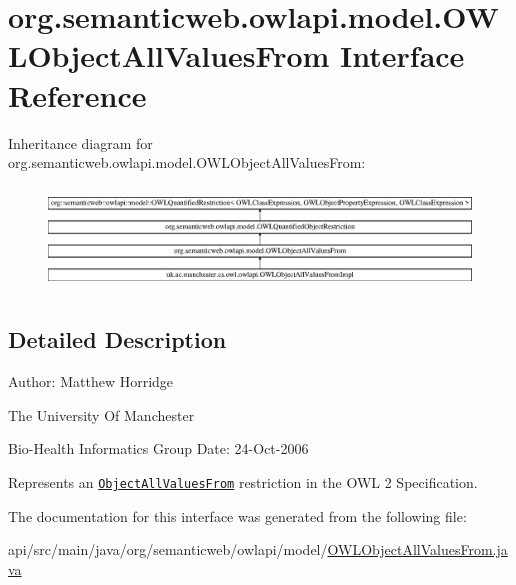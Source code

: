 \hypertarget{interfaceorg_1_1semanticweb_1_1owlapi_1_1model_1_1_o_w_l_object_all_values_from}{\section{org.\-semanticweb.\-owlapi.\-model.\-O\-W\-L\-Object\-All\-Values\-From Interface Reference}
\label{interfaceorg_1_1semanticweb_1_1owlapi_1_1model_1_1_o_w_l_object_all_values_from}
}
Inheritance diagram for org.\-semanticweb.\-owlapi.\-model.\-O\-W\-L\-Object\-All\-Values\-From\-:\begin{figure}[H]
\begin{center}
\leavevmode
\includegraphics[height=2.768850cm]{interfaceorg_1_1semanticweb_1_1owlapi_1_1model_1_1_o_w_l_object_all_values_from}
\end{center}
\end{figure}


\subsection{Detailed Description}
Author\-: Matthew Horridge\par
 The University Of Manchester\par
 Bio-\/\-Health Informatics Group Date\-: 24-\/\-Oct-\/2006 

Represents an \href{http://www.w3.org/TR/2009/REC-owl2-syntax-20091027/#Universal_Quantification_2}{\tt Object\-All\-Values\-From} restriction in the O\-W\-L 2 Specification. 

The documentation for this interface was generated from the following file\-:\begin{DoxyCompactItemize}
\item 
api/src/main/java/org/semanticweb/owlapi/model/\hyperlink{_o_w_l_object_all_values_from_8java}{O\-W\-L\-Object\-All\-Values\-From.\-java}\end{DoxyCompactItemize}
